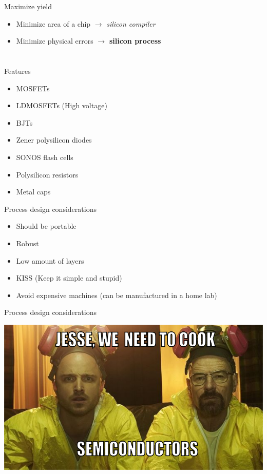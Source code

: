\documentclass[aspectratio=169]{beamer}
\begin{document}
\begin{frame}{Maximize yield}
	\begin{itemize}
        \setlength\itemsep{1em}
		\item Minimize area of a chip $\rightarrow$ \textit{silicon compiler}
		\item Minimize physical errors $\rightarrow$ \textbf{silicon process}
	\end{itemize}
\end{frame}

\section[Process]{}

\begin{frame}{Features}
	\begin{itemize}
        \setlength\itemsep{1em}
		\item MOSFETs
		\item LDMOSFETs (High voltage) 
		\item BJTs
		\item Zener polysilicon diodes
		\item SONOS flash cells
		\item Polysilicon resistors
		\item Metal caps
	\end{itemize}
\end{frame}

\begin{frame}{Process design considerations}
	\begin{itemize}
		\item Should be portable
		\item Robust
		\item Low amount of layers
		\item KISS (Keep it simple and stupid)
		\item Avoid expensive machines (can be manufactured in a home lab)
	\end{itemize}
\end{frame}

\begin{frame}{Process design considerations}
	\begin{center}
		\includegraphics[height=0.8\textheight]{images/breaking-bad.png}
	\end{center}
\end{frame}
\end{document}

